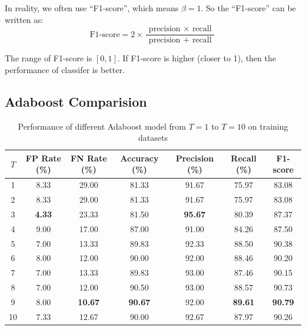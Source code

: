 \documentclass{article}[12pt, twocolumn]
\begin{document}
In reality, we often use ``F1-score'', which means $\beta=1$. So the ``F1-score'' can be written as:
\begin{equation}
    \text {F1-score}=2 \times \frac{\text { precision } \times \text { recall }}{\text { precision }+\text { recall }}
\end{equation}

The range of F1-score is $[0, 1]$. If F1-score is higher (closer to 1), 
then the performance of classifer is better.

\subsection{Adaboost Comparision} \label{subsec:ada_comp}

\begin{table}[]
    \centering    
    \caption{Performance of different Adaboost model from $T=1$ to $T=10$ on training datasets}
    \begin{tabular}{@{}ccccccc@{}}
        \toprule
        $T$  & FP Rate (\%)  & FN Rate (\%)   & Accuracy (\%)  & Precision (\%)   & Recall (\%)      & F1-score         \\ \midrule
        1  & 8.33          & 29.00          & 81.33          & 91.67        & 75.97        & 83.08        \\
        2  & 8.33          & 29.00          & 81.33          & 91.67        & 75.97        & 83.08        \\
        3  & \textbf{4.33} & 23.33          & 81.50          & \textbf{95.67}        & 80.39        & 87.37        \\
        4  & 9.00          & 17.00          & 87.00          & 91.00        & 84.26        & 87.50        \\
        5  & 7.00          & 13.33          & 89.83          & 92.33        & 88.50        & 90.38        \\
        6  & 8.00          & 12.00 & 90.00          & 92.00        & 88.46        & 90.20        \\
        7  & 7.00          & 13.33          & 89.83          & 93.00 & 87.46        & 90.15        \\
        8  & 7.00          & 12.00 & 90.50          & 93.00        & 88.57        & 90.73        \\
        9  & 8.00          & \textbf{10.67}          & \textbf{90.67} & 92.00        & \textbf{89.61} & \textbf{90.79} \\
        10 & 7.33          & 12.67          & 90.00          & 92.67        & 87.97        & 90.26        \\ \bottomrule
        \end{tabular}
        \label{tab:ada_train}
\end{table}
\end{document}
